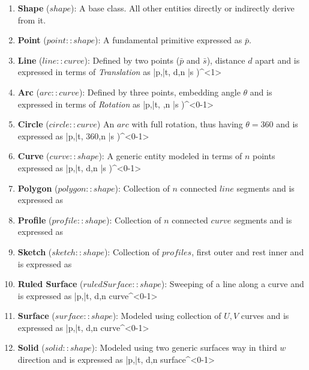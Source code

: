 \begin{enumerate}

\item {\bf Shape} ($shape$): A base class. All other entities directly or indirectly derive from it.

\item {\bf Point} ($point::shape$): A fundamental primitive expressed as $\bar{p}$. 	

\item {\bf Line} ($line::curve$): Defined by two points ($\bar{p}$ and $\bar{s}$), distance $d$ apart and is expressed in terms of {\em Translation} as  {\bar{p},\bar{t}, d,n} {\bar{s} )^{<1>} }	

\item  {\bf Arc} ($arc::curve$): Defined by three points, embedding angle $\theta$ and is expressed in terms of {\em Rotation} as  {\bar{p},\bar{t}, \theta,n} {\bar{s} )^{<0-1>}}	

\item {\bf Circle} ($circle::curve$) An $arc$ with full rotation, thus having $\theta = 360$ and is expressed as  {\bar{p},\bar{t}, 360,n} {\bar{s} )^{<0-1>}} 

\item {\bf Curve} ($curve::shape$): A generic entity modeled in terms of $n$ points expressed as  {\bar{p},\bar{t}, d,n} {\bar{s} )^{<0-1>}} 

\item {\bf Polygon} ($polygon::shape$): Collection of $n$ connected $line$ segments and is expressed as 	

\item {\bf Profile} ($profile::shape$): Collection of $n$ connected $curve$ segments and  is expressed as  

\item {\bf Sketch} ($sketch::shape$): Collection of $profiles$, first outer and rest  inner  and is expressed as 		

\item {\bf Ruled Surface} ($ruledSurface::shape$): Sweeping of a line along a curve and is expressed as  {\bar{p},\bar{t}, d,n} {curve{^{<0-1>} }}	

\item {\bf Surface} ($surface::shape$): Modeled using collection of $U,V$ curves	and is expressed as  {\bar{p},\bar{t}, d,n} {curve{^{<0-1>} }}   

\item {\bf Solid} ($solid::shape$): Modeled using two generic surfaces way in third $w$ direction and is expressed as  {\bar{p},\bar{t}, d,n} {surface{^{<0-1>} }} 	

\end{enumerate}

